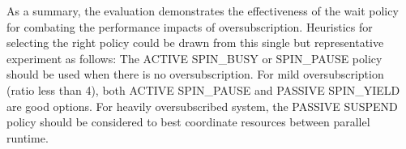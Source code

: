 As a summary, the evaluation demonstrates the effectiveness of the wait policy for combating the performance 
impacts of oversubscription. Heuristics for selecting the right policy 
could be drawn from this single but representative experiment as follows:
The {\sf ACTIVE SPIN\_BUSY} or {SPIN\_PAUSE} policy should be used when there is no oversubscription. 
For mild oversubscription (ratio less than 4), both {\sf ACTIVE SPIN\_PAUSE} and {\sf PASSIVE SPIN\_YIELD} are good options. 
For heavily oversubscribed system, the {\sf PASSIVE SUSPEND} policy should be 
considered to best coordinate resources between parallel runtime. 



